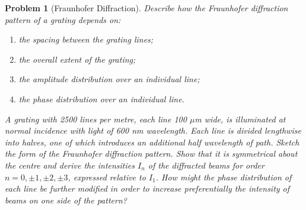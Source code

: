 \documentclass[a4paper]{article}
\theoremstyle{new}
\newtheorem{qns}{Problem}[section]
\begin{document}
\newpage
\begin{qns}[Fraunhofer Diffraction]
Describe how the Fraunhofer diffraction pattern of a grating depends on:
\begin{enumerate}[label=(\alph*)]
\item the spacing between the grating lines;
\item the overall extent of the grating;
\item the amplitude distribution over an individual line;
\item the phase distribution over an individual line.
\end{enumerate}
A grating with 2500 lines per metre, each line 100 $\mu$m wide, is illuminated at normal incidence with light of 600 nm wavelength. Each line is divided lengthwise into halves, one of which introduces an additional half wavelength of path. Sketch the form of the Fraunhofer diffraction pattern. Show that it is symmetrical about the centre and derive the intensities $I_n$ of the diffracted beams for order $n=0,\pm1,\pm2,\pm3$, expressed relative to $I_1$. How might the phase distribution of each line be further modified in order to increase preferentially the intensity of beams on one side of the pattern?
\end{qns}
\end{document}
